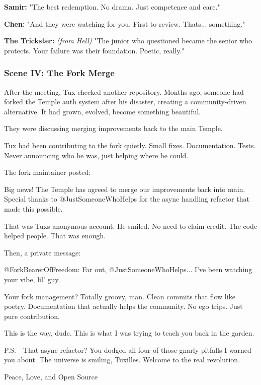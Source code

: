 \textbf{Samir:} "The best redemption. No drama. Just competence and care."

\textbf{Chen:} "And they were watching for you. First to review. That\textquotesingle s... something."

\textbf{The Trickster:} \emph{(from Hell)} "The junior who questioned became the senior who protects. Your failure was their foundation. Poetic, really."

\bookdivider

\subsubsection{Scene IV: The Fork Merge}\label{scene-iv-the-fork-merge}

After the meeting, Tux checked another repository. Months ago, someone had forked the Temple auth system after his disaster, creating a community-driven alternative. It had grown, evolved, become something beautiful.

They were discussing merging improvements back to the main Temple.

Tux had been contributing to the fork quietly. Small fixes. Documentation. Tests. Never announcing who he was, just helping where he could.

The fork maintainer posted:

\begin{codeblock}
Big news! The Temple has agreed to merge our improvements back
into main. Special thanks to @JustSomeoneWhoHelps for the 
async handling refactor that made this possible.
\end{codeblock}

That was Tux\textquotesingle s anonymous account. He smiled. No need to claim credit. The code helped people. That was enough.

Then, a private message:

\begin{codeblock}
@ForkBearerOfFreedom: Far out, @JustSomeoneWhoHelps... 
I've been watching your vibe, lil' guy.

Your fork management? Totally groovy, man. 
Clean commits that flow like poetry.
Documentation that actually helps the community.
No ego trips. Just pure contribution. 

This is the way, dude. This is what I was trying to 
teach you back in the garden.

P.S. - That async refactor? You dodged all four of 
those gnarly pitfalls I warned you about. The universe 
is smiling, Tuxilles. Welcome to the real revolution.

Peace, Love, and Open Source
\end{codeblock}

